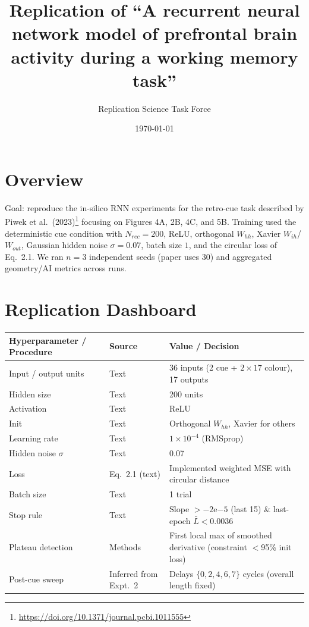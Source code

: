 \documentclass{article}
\title{Replication of ``A recurrent neural network model of prefrontal brain activity during a working memory task''}
\author{Replication Science Task Force}
\date{\today}
\begin{document}
\maketitle

\section{Overview}
Goal: reproduce the in-silico RNN experiments for the retro-cue task described by Piwek et al.\ (2023)\footnote{\url{https://doi.org/10.1371/journal.pcbi.1011555}} focusing on Figures 4A, 2B, 4C, and 5B. Training used the deterministic cue condition with $N_{rec}=200$, ReLU, orthogonal $W_{hh}$, Xavier $W_{ih}$/$W_{out}$, Gaussian hidden noise $\sigma=0.07$, batch size $1$, and the circular loss of Eq.~2.1. We ran $n=3$ independent seeds (paper uses 30) and aggregated geometry/AI metrics across runs.

\section{Replication Dashboard}
\begin{table}[h]
    \centering
    \begin{tabular}{lll}
    \toprule
    Hyperparameter / Procedure & Source & Value / Decision \\
    \midrule
    Input / output units & Text & 36 inputs (2 cue + $2 \times 17$ colour), 17 outputs \\
    Hidden size & Text & 200 units \\
    Activation & Text & ReLU \\
    Init & Text & Orthogonal $W_{hh}$, Xavier for others \\
    Learning rate & Text & $1\times10^{-4}$ (RMSprop) \\
    Hidden noise $\sigma$ & Text & 0.07 \\
    Loss & Eq.~2.1 (text) & Implemented weighted MSE with circular distance \\
    Batch size & Text & 1 trial \\
    Stop rule & Text & Slope $>-2\mathrm{e}{-5}$ (last 15) \& last-epoch $\bar{L}<0.0036$ \\
    Plateau detection & Methods & First local max of smoothed derivative (constraint $<$95\% init loss) \\
    Post-cue sweep & Inferred from Expt.~2 & Delays $\{0,2,4,6,7\}$ cycles (overall length fixed) \\
    \bottomrule
    \end{tabular}
\end{table}
\end{document}
